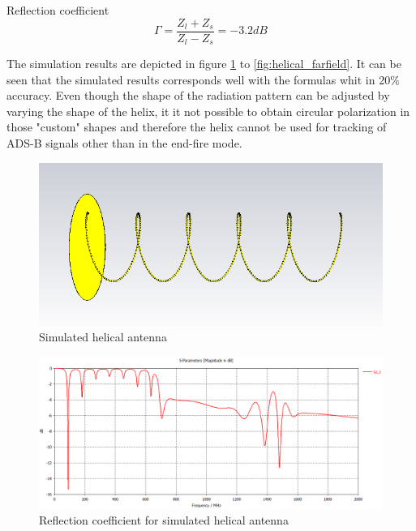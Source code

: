 Reflection coefficient 
\begin{equation}
\Gamma = \frac{Z_l+Z_s}{Z_l-Z_s} = -3.2dB
\end{equation}  
\label{eq:heli4}

The simulation results are depicted in figure \ref{fig:helical_cst} to \ref{fig:helical_farfield}. It can be seen that the simulated results corresponds well with the formulas whit in 20\% accuracy. Even though the shape of the radiation pattern can be adjusted by varying the shape of the helix, it it not possible to obtain circular polarization in those "custom" shapes and therefore the helix cannot be used for tracking of ADS-B signals other than in the end-fire mode. 

\begin{figure}[H]
\centering 
\includegraphics[scale = 0.5]{figures/antennas/helical/helical_cst}
\caption{Simulated helical antenna}
\label{fig:helical_cst}
\end{figure}

\begin{figure}[H]
\centering 
\includegraphics[scale = 0.35]{figures/antennas/helical/helical_cst_s11}
\caption{Reflection coefficient for simulated helical antenna}
\label{fig:helical_s11}
\end{figure}

